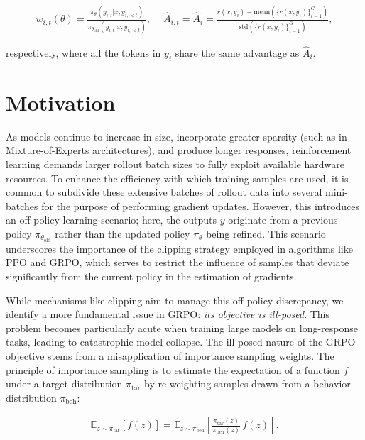 \begin{align}
    w_{i,t}(\theta)=\frac{ \pi_{\theta} (y_{i,t} | x, y_{i,<t}) }{ \pi_{\theta_\text{old}} (y_{i,t} | x,y_{i,<t})},\quad\ 
    \widehat{A}_{i,t} = \widehat{A}_{i} = \frac{r(x, y_i) - \mathrm{mean} \left( \{ r(x, y_i) \}_{i=1}^G \right) }{ \mathrm{std} \left( \{ r(x, y_i) \}_{i=1}^G \right) },
\end{align}

respectively, where all the tokens in $y_i$ share the same advantage as $\widehat{A}_{i}$.

\section{Motivation}
\label{sec:motivation}

As models continue to increase in size, incorporate greater sparsity (such as in Mixture-of-Experts architectures), and produce longer responses, reinforcement learning demands larger rollout batch sizes to fully exploit available hardware resources. To enhance the efficiency with which training samples are used, it is common to subdivide these extensive batches of rollout data into several mini-batches for the purpose of performing gradient updates. However, this introduces an off-policy learning scenario; here, the outputs $y$ originate from a previous policy $\pi_{\theta_\text{old}}$ rather than the updated policy $\pi_\theta$ being refined. This scenario underscores the importance of the clipping strategy employed in algorithms like PPO and GRPO, which serves to restrict the influence of samples that deviate significantly from the current policy in the estimation of gradients.

While mechanisms like clipping aim to manage this off-policy discrepancy, we identify a more fundamental issue in GRPO: \textit{its objective is ill-posed}. This problem becomes particularly acute when training large models on long-response tasks, leading to catastrophic model collapse. The ill-posed nature of the GRPO objective stems from a misapplication of importance sampling weights. The principle of importance sampling is to estimate the expectation of a function $f$ under a target distribution $\pi_\text{tar}$ by re-weighting samples drawn from a behavior distribution $\pi_\text{beh}$:

\begin{align}
\mathbb{E}_{z \sim \pi_\text{tar}} \left[ f(z) \right] = \mathbb{E}_{z \sim \pi_\text{beh}} \left[ \frac{ \pi_\text{tar} (z) }{ \pi_\text{beh} (z)} \, f(z) \right].
\end{align}

